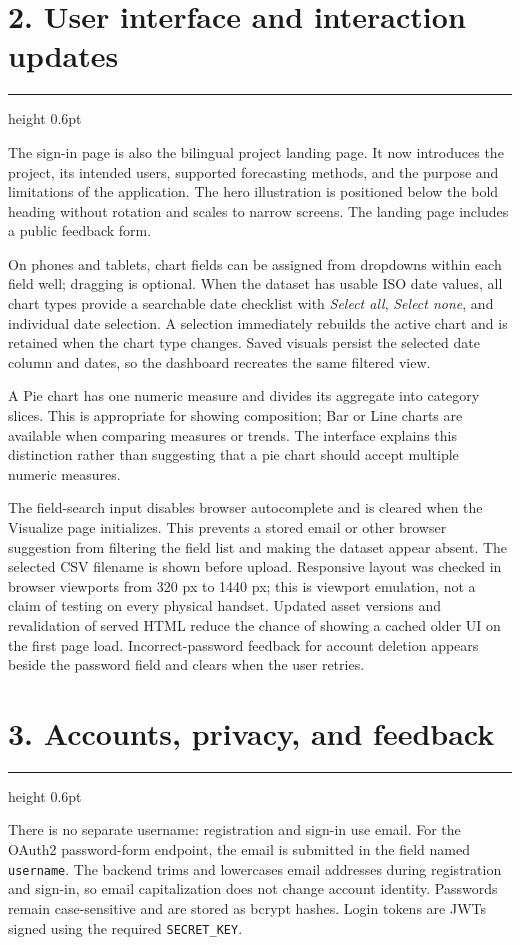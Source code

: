 \documentclass[11pt,a4paper]{article}
\newcommand{\sectiontitle}[1]{%
  \Needspace{5\baselineskip}\vspace{2pt}\section*{\color{brand}#1}\vspace{-5pt}\hrule height 0.6pt\vspace{7pt}
}
\begin{document}
\sectiontitle{2. User interface and interaction updates}

The sign-in page is also the bilingual project landing page. It now introduces
the project, its intended users, supported forecasting methods, and the purpose
and limitations of the application. The hero illustration is positioned below
the bold heading without rotation and scales to narrow screens. The landing
page includes a public feedback form.

On phones and tablets, chart fields can be assigned from dropdowns within each
field well; dragging is optional. When the dataset has usable ISO date values,
all chart types provide a searchable date checklist with \textit{Select all},
\textit{Select none}, and individual date selection. A selection immediately
rebuilds the active chart and is retained when the chart type changes. Saved
visuals persist the selected date column and dates, so the dashboard recreates
the same filtered view.

A Pie chart has one numeric measure and divides its aggregate into category
slices. This is appropriate for showing composition; Bar or Line charts are
available when comparing measures or trends. The interface explains this
distinction rather than suggesting that a pie chart should accept multiple
numeric measures.

The field-search input disables browser autocomplete and is cleared when the
Visualize page initializes. This prevents a stored email or other browser
suggestion from filtering the field list and making the dataset appear absent.
The selected CSV filename is shown before upload. Responsive layout was checked
in browser viewports from 320 px to 1440 px; this is viewport emulation, not a
claim of testing on every physical handset. Updated asset versions and
revalidation of served HTML reduce the chance of showing a cached older UI on
the first page load. Incorrect-password feedback for account deletion appears
beside the password field and clears when the user retries.

\sectiontitle{3. Accounts, privacy, and feedback}

There is no separate username: registration and sign-in use email. For the
OAuth2 password-form endpoint, the email is submitted in the field named
\texttt{username}. The backend trims and lowercases email addresses during
registration and sign-in, so email capitalization does not change account
identity. Passwords remain case-sensitive and are stored as bcrypt hashes.
Login tokens are JWTs signed using the required \texttt{SECRET\_KEY}.
\end{document}
